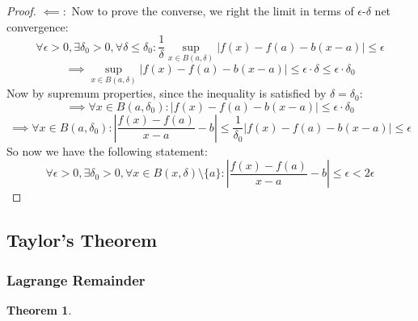 \documentclass[10pt,letterpaper]{article} %
\newtheorem{thm}{Theorem}[section]
\begin{document}
\begin{proof}
$\impliedby:$ Now to prove the converse, we right the limit in terms of $\epsilon$-$\delta$ net convergence:
\begin{equation*}
\forall \epsilon > 0, \exists \delta_0 > 0, \forall \delta \leqslant \delta_0: \frac{1}{\delta}\sup_{x \in B(a, \delta)}|f(x) - f(a) - b(x-a)| \leqslant \epsilon
\end{equation*}
\begin{equation*}
\implies \sup_{x \in B(a, \delta)}|f(x) - f(a) - b(x-a)| \leqslant \epsilon \cdot \delta \leqslant \epsilon \cdot \delta_0
\end{equation*}
Now by supremum properties, since the inequality is satisfied by $\delta = \delta_0$:
\begin{equation*}
\implies \forall x \in B(a, \delta_0):  |f(x) - f(a) - b(x-a)| \leqslant \epsilon \cdot \delta_0
\end{equation*}
\begin{equation*}
\implies \forall x \in B(a, \delta_0): \left|\frac{f(x) - f(a)}{x-a} - b\right| \leqslant \frac{1}{\delta_0}|f(x) - f(a) - b(x-a)| \leqslant \epsilon
\end{equation*}
So now we have the following statement:
\begin{equation*}
\forall \epsilon > 0, \exists \delta_0 > 0, \forall x \in B(x, \delta)\setminus\{a\}: \left|\frac{f(x) - f(a)}{x-a} - b\right| \leqslant \epsilon < 2\epsilon
\end{equation*}
\end{proof}

\subsection{Taylor's Theorem}
\subsubsection{Lagrange Remainder}
\begin{thm}

\end{thm}


\pagebreak
\end{document}
